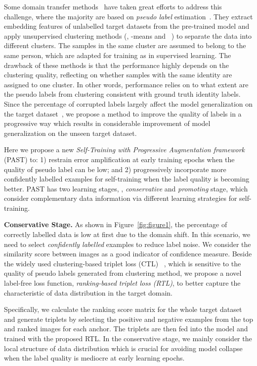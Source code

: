 \documentclass[10pt,twocolumn,letterpaper]{article}
\begin{document}
Some domain transfer methods~\cite{HHL, EANet, UMDL, PUL, tfusion, ARN, theory, stepwise} have taken great efforts to address this challenge, where the majority are based on \emph{pseudo label} estimation~\cite{PUL, theory, tfusion}.
They extract embedding features of unlabelled target datasets from the pre-trained model and apply unsupervised clustering methods (\eg, -means and ~\cite{DBSCAN}) to separate the data into different clusters. 
The samples in the same cluster are assumed to belong to the same person, which are adapted for training as in supervised learning.
The drawback of these methods is that the performance highly depends on the clustering quality, reflecting on whether samples with the same identity are assigned to one cluster. 
In other words, performance relies on to what extent are the pseudo labels from clustering consistent with ground truth identity labels.
Since the percentage of corrupted labels largely affect the model generalization on the target dataset~\cite{generalization}, we propose a method to improve the quality of labels in a progressive way which results in considerable improvement of model generalization on the unseen target dataset.

Here 
we propose a 
new 
\emph{Self-Training with Progressive Augmentation framework} (PAST) to: 1) restrain error amplification at early training epochs when the quality of pseudo label can be low; and 2) progressively incorporate more confidently labelled examples for self-training when the label quality is becoming better. PAST has two learning stages, \ie, \emph{conservative} and \emph{promoting} stage, which consider complementary data information via different learning strategies for self-training.

\noindent\textbf{Conservative Stage.}
As shown in Figure~\ref{fig:figure1}, the percentage of correctly labelled data is low at first due to the domain shift. In this scenario, we need to select \textit{confidently labelled} examples to reduce label noise. We consider the similarity score between images as a good indicator of confidence measure. Beside 
the widely used clustering-based triplet loss (CTL) ~\cite{batchhardtriplet}, which is sensitive to the quality of pseudo labels generated from clustering method, we propose a novel label-free loss function, \emph{ranking-based triplet loss (RTL)}, to better capture the characteristic of data distribution in the target domain.

Specifically, we calculate the ranking score matrix for the whole target dataset and generate triplets by selecting the positive and negative examples from the top  and   ranked images for each anchor. The triplets are then fed into the model and trained with the proposed RTL. 
In the conservative stage, we mainly consider the local structure of data distribution which is crucial for avoiding model collapse when the label quality is mediocre at early learning epochs.
\end{document}
